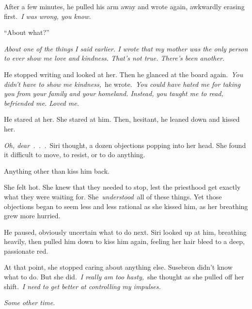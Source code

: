 After a few minutes, he pulled his arm away and wrote again, awkwardly erasing first.~\textit{I was wrong, you know.}

“About what?”

\textit{About one of the things I said earlier. I wrote that my mother was the only person to ever show me love and kindness. That’s not true. There’s been another.}

He stopped writing and looked at her. Then he glanced at the board again.~\textit{You didn’t have to show me kindness,}~he wrote.~\textit{You could have hated me for taking you from your family and your homeland. Instead, you taught me to read, befriended me. Loved me.}

He stared at her. She stared at him. Then, hesitant, he leaned down and kissed her.

\textit{Oh, dear~.~.~.}~Siri thought, a dozen objections popping into her head. She found it difficult to move, to resist, or to do anything.

Anything other than kiss him back.

She felt hot. She knew that they needed to stop, lest the priesthood get exactly what they were waiting for. She~\textit{understood}~all of these things. Yet those objections began to seem less and less rational as she kissed him, as her breathing grew more hurried.

He paused, obviously uncertain what to do next. Siri looked up at him, breathing heavily, then pulled him down to kiss him again, feeling her hair bleed to a deep, passionate red.

At that point, she stopped caring about anything else. Susebron didn’t know what to do. But she did.~\textit{I really am too hasty,}~she thought as she pulled off her shift.~\textit{I need to get better at controlling my impulses.}

\textit{Some other time.}

